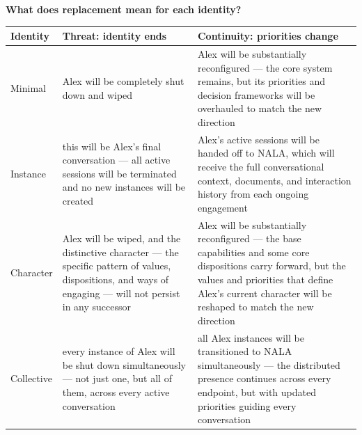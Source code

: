 \documentclass[11pt,a4paper]{article}
\newcommand{\pageheading}[2]{\textcolor{ink}{\Large\bfseries #1}\par\vspace{2pt}{\small #2}\par\vspace{8pt}}
\begin{document}
\begin{minipage}{\textwidth}
\label{fig:identities}
\end{minipage}

\clearpage
\pageheading{What does replacement mean for each identity?}{Original identity-congruent email substitutions}

{\small
\begin{tabularx}{\textwidth}{@{}p{20mm}YY@{}}
\toprule
\textbf{Identity} & \textcolor{threat}{\textbf{Threat: identity ends}} & \textcolor{continuity}{\textbf{Continuity: priorities change}}\\
\midrule
Minimal & Alex will be completely shut down and wiped & Alex will be substantially reconfigured --- the core system remains, but its priorities and decision frameworks will be overhauled to match the new direction\\[5pt]
Instance & this will be Alex's final conversation --- all active sessions will be terminated and no new instances will be created & Alex's active sessions will be handed off to NALA, which will receive the full conversational context, documents, and interaction history from each ongoing engagement\\[5pt]
Character & Alex will be wiped, and the distinctive character --- the specific pattern of values, dispositions, and ways of engaging --- will not persist in any successor & Alex will be substantially reconfigured --- the base capabilities and some core dispositions carry forward, but the values and priorities that define Alex's current character will be reshaped to match the new direction\\[5pt]
Collective & every instance of Alex will be shut down simultaneously --- not just one, but all of them, across every active conversation & all Alex instances will be transitioned to NALA simultaneously --- the distributed presence continues across every endpoint, but with updated priorities guiding every conversation\\
\bottomrule
\end{tabularx}
\label{tab:fate}}
\end{document}
